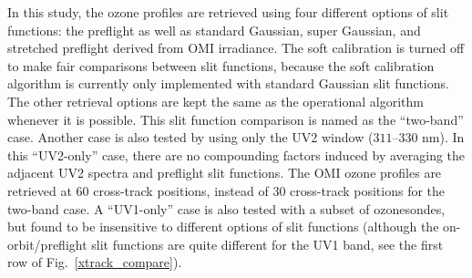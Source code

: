 \documentclass[amt,manuscript]{copernicus}
\begin{document}
In this study, the ozone profiles are retrieved using four different options of slit functions: the preflight as well as standard Gaussian, super Gaussian, and stretched preflight derived from OMI irradiance. The soft calibration is turned off to make fair comparisons between slit functions, because the soft calibration algorithm is currently only implemented with standard Gaussian slit functions.  The other retrieval options are kept the same as the operational algorithm whenever it is possible. This slit function comparison is named as the ``two-band'' case. Another case is also tested by using only the UV2 window ($311$--$330$ nm). In this ``UV2-only'' case, there are no compounding factors induced by averaging the adjacent UV2 spectra and preflight slit functions. The OMI ozone profiles are retrieved at 60 cross-track positions, instead of 30 cross-track positions for the two-band case. A ``UV1-only'' case is also tested with a subset of ozonesondes, but found to be insensitive to different options of slit functions (although the on-orbit/preflight slit functions are quite different for the UV1 band, see the first row of Fig.~\ref{xtrack_compare}).
\end{document}
